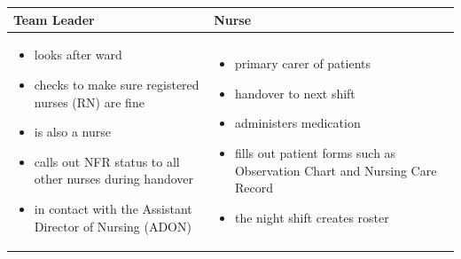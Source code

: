 \hfil\begin{tabular}{|p{7cm}|p{7cm}|}
\hline
{\hfil\bf Team Leader} & {\hfil\bf Nurse} \\
\hline
\vspace{-5mm}\begin{itemize}
\item looks after ward
\item checks to make sure registered nurses (RN) are fine
\item is also a nurse
\item calls out \gls{NFR} status to all other nurses during handover
\item in contact with the Assistant Director of Nursing (ADON)
\end{itemize} & 
\vspace{-5mm}\begin{itemize}
\item primary carer of patients
\item handover to next shift
\item administers medication
\item fills out patient forms such as Observation Chart and Nursing Care Record
\item the night shift creates roster
\end{itemize} \\ 
\hline
\end{tabular}

